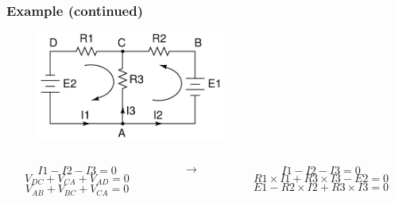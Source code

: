 \documentclass[beamer]{standalone}
\begin{document}
\begin{frame}
 \frametitle{Example (continued)}
	\begin{figure}
		\includegraphics[width=0.55\textwidth]{./circuits/sample_circuit}
	\end{figure}
	\begin{columns}[c]
		\begin{column}{.45\textwidth}
			\begin{equation*}
				I1-I2-I3=0 
			\end{equation*}
			\begin{equation*}
				V_{DC}+V_{CA}+V_{AD}=0 
			\end{equation*}
			\begin{equation*}
				V_{AB}+V_{BC}+V_{CA}=0
			\end{equation*}
		\end{column}
		\begin{column}{.1\textwidth}
			\begin{equation*}
				\to 
			\end{equation*}
		\end{column}
		\begin{column}{.45\textwidth}
			\begin{equation*}
				I1-I2-I3=0 
			\end{equation*}
			\begin{equation*}
				 R1 \times I1 + R3 \times I3 -E2 =0
			\end{equation*}
			\begin{equation*}
				E1 - R2 \times I2 + R3 \times I3 =0
			\end{equation*}
		\end{column}
	\end{columns}
\end{frame}
\end{document}
